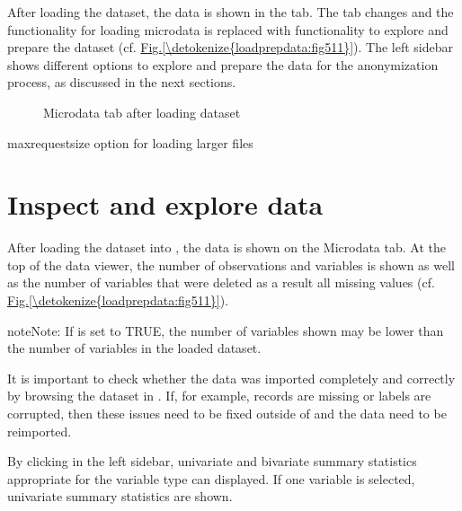 \documentclass[letterpaper,10pt,english]{sphinxmanual}
\begin{document}
After loading the dataset, the data is shown in the  tab. The 
tab changes and the functionality for loading microdata is replaced with
functionality to explore and prepare the dataset (cf. \hyperref[\detokenize{loadprepdata:fig511}]{Fig.\@ \ref{\detokenize{loadprepdata:fig511}}}). The
left sidebar shows different options to explore and prepare the data for the anonymization process,
as discussed in the next sections.

\begin{figure}[htbp]
\centering
\capstart

\noindent{}
\caption{Microdata tab after loading dataset}\label{\detokenize{loadprepdata:fig511}}\label{\detokenize{loadprepdata:id6}}\end{figure}

maxrequestsize option for loading larger files


\section{Inspect and explore data}
\label{\detokenize{loadprepdata:inspect-and-explore-data}}
After loading the dataset into , the data is shown on the Microdata tab. At the top of
the data viewer, the number of observations and variables is shown as well as the number
of variables that were deleted as a result all missing values (cf. \hyperref[\detokenize{loadprepdata:fig511}]{Fig.\@ \ref{\detokenize{loadprepdata:fig511}}}).

\begin{sphinxadmonition}{note}{Note:}
If  is set to TRUE, the number of variables
shown may be lower than the number of variables in the loaded dataset.
\end{sphinxadmonition}

It is important to check whether the data was imported completely and correctly by browsing
the dataset in . If, for example, records are missing or labels are corrupted,
then these issues need to be fixed outside of  and the data need to be reimported.

By clicking  in the left sidebar, univariate and bivariate summary
statistics appropriate for the variable type can displayed. If one variable is selected,
univariate summary statistics are shown.
\end{document}
